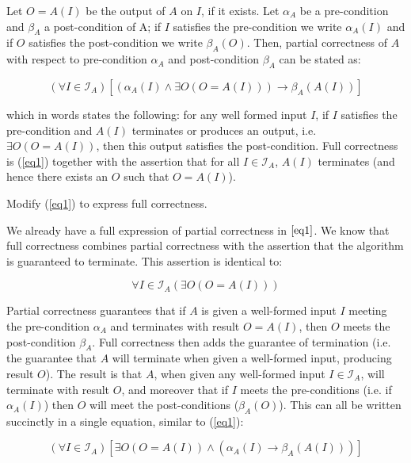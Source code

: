 \documentclass{article}
\newenvironment{prb}[1]
	{\renewcommand\theinner{#1}\inner}
	{\endinner}
\begin{document}
Let $O=A(I)$ be the output of $A$ on $I$, if it exists.
Let $\alpha_A$ be a pre-condition and $\beta_A$ a post-condition of A;
if $I$ satisfies the pre-condition we write $\alpha_A(I)$ and
if $O$ satisfies the post-condition we write $\beta_A(O)$.
Then, partial correctness of $A$ with respect to pre-condition
$\alpha_A$ and post-condition $\beta_A$ can be stated as:

\begin{equation}\label{eq1}
	(\forall I\in\mathcal{I}_A)
	[(\alpha_A(I)\wedge\exists O(O=A(I)))\rightarrow\beta_A(A(I))]
\end{equation}

\noindent which in words states the following: for any well formed 
input $I$, if $I$ satisfies the pre-condition and $A(I)$ terminates
or produces an output, i.e. $\exists O(O=A(I))$, then this output
satisfies the post-condition. Full correctness is (\ref{eq1})
together with the assertion that for all $I\in\mathcal{I}_A$, $A(I)$
terminates (and hence there exists an $O$ such that $O=A(I)$).

\begin{prb}{1.1}
Modify (\ref{eq1}) to express full correctness.
\end{prb}

\break
We already have a full expression of partial correctness in $\ref{eq1}$.
We know that full correctness combines partial correctness with the
assertion that the algorithm is guaranteed to terminate. This assertion
is identical to:

\begin{equation}\label{eq2}
\forall I\in\mathcal{I}_A(\exists O(O=A(I)))
\end{equation}

Partial correctness guarantees that if $A$ is given a well-formed input
$I$ meeting the pre-condition $\alpha_A$ and terminates with result 
$O=A(I)$, then $O$ meets the post-condition $\beta_A$. Full correctness
then adds the guarantee of termination (i.e. the guarantee that $A$ will
terminate when given a well-formed input, producing result $O$). The result
is that $A$, when given any well-formed input $I\in\mathcal{I}_A$, will
terminate with result $O$, and moreover that if $I$ meets the pre-conditions
(i.e. if $\alpha_A(I)$) then $O$ will meet the post-conditions ($\beta_A(O)$).
This can all be written succinctly in a single equation, similar to 
(\ref{eq1}):

\begin{equation}\label{eq3}
	(\forall I\in\mathcal{I}_A)
	[\exists O(O=A(I))\wedge(\alpha_A(I)\rightarrow\beta_A(A(I)))]
\end{equation}
\end{document}
